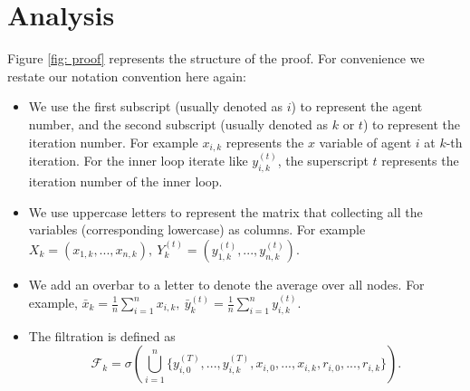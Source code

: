 \documentclass{article}
\theoremstyle{plain}
\theoremstyle{definition}
\theoremstyle{remark}
\newcommand{\F}{\mathcal{F}}
\begin{document}
\section{Analysis}\label{sec: analysis}
Figure \ref{fig: proof} represents the structure of the proof. For convenience we restate our notation convention here again:
\begin{itemize}
    \item We use the first subscript (usually denoted as $i$) to represent the agent number, and the second subscript (usually denoted as $k$ or $t$) to represent the iteration number. For example $x_{i,k}$ represents the $x$ variable of agent $i$ at $k$-th iteration. For the inner loop iterate like $y_{i,k}^{(t)}$, the superscript $t$ represents the iteration number of the inner loop.
    
    \item We use uppercase letters to represent the matrix that collecting all the variables (corresponding lowercase) as columns. For example $X_k = \left(x_{1,k}, ..., x_{n,k}\right),\ Y_k^{(t)} = \left(y_{1,k}^{(t)},...,y_{n,k}^{(t)}\right)$.
    
    \item We add an overbar to a letter to denote the average over all nodes. For example, $\bar{x}_k = \frac{1}{n}\sum_{i=1}^{n}x_{i,k},\ \bar{y}_{k}^{(t)} = \frac{1}{n}\sum_{i=1}^{n}y_{i,k}^{(t)}$.
    
    \item The filtration is defined as
    \[
        \F_k = \sigma\left(\bigcup_{i=1}^{n}\{y_{i,0}^{(T)}, ..., y_{i,k}^{(T)}, x_{i,0},...,x_{i,k}, r_{i,0},...,r_{i,k}\} \right).
    \]
\end{itemize}
\end{document}
